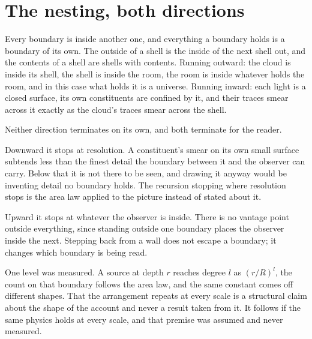 \section{The nesting, both directions}

Every boundary is inside another one, and everything a boundary holds is a boundary of its own. The
outside of a shell is the inside of the next shell out, and the contents of a shell are shells with
contents. Running outward: the cloud is inside its shell, the shell is inside the room, the room is
inside whatever holds the room, and in this case what holds it is a universe. Running inward: each
light is a closed surface, its own constituents are confined by it, and their traces smear across it
exactly as the cloud's traces smear across the shell.

Neither direction terminates on its own, and both terminate for the reader.

Downward it stops at resolution. A constituent's smear on its own small surface subtends less than
the finest detail the boundary between it and the observer can carry. Below that it is not there
to be seen, and drawing it anyway would be inventing detail no boundary holds. The recursion
stopping where resolution stops is the area law applied to the picture instead of stated about it.

Upward it stops at whatever the observer is inside. There is no vantage point outside everything,
since standing outside one boundary places the observer inside the next. Stepping back from a wall
does not escape a boundary; it changes which boundary is being read.

One level was measured. A source at depth $r$ reaches degree $l$ as $(r/R)^l$, the count on that
boundary follows the area law, and the same constant comes off different shapes. That the
arrangement repeats at every scale is a structural claim about the shape of the account and never a
result taken from it. It follows if the same physics holds at every scale, and that premise was
assumed and never measured.
